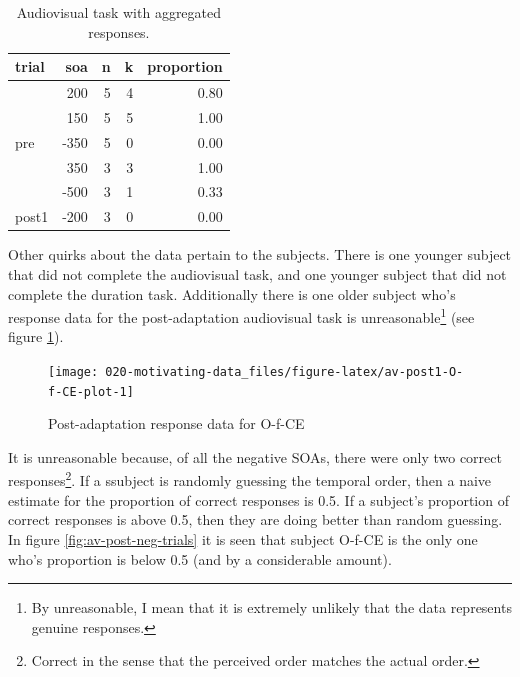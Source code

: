 \documentclass[11pt, oneside]{book}
\begin{document}
\begin{table}[!h]

\caption{\label{tab:av-bin-sample}Audiovisual task with aggregated responses.}
\centering
\begin{tabular}[t]{lrrrr}
\toprule
trial & soa & n & k & proportion\\
\midrule
 & 200 & 5 & 4 & 0.80\\
\cmidrule{2-5}
 & 150 & 5 & 5 & 1.00\\
\cmidrule{2-5}
\multirow[t]{-3}{*}{\raggedright\arraybackslash pre} & -350 & 5 & 0 & 0.00\\
\cmidrule{1-5}
 & 350 & 3 & 3 & 1.00\\
\cmidrule{2-5}
 & -500 & 3 & 1 & 0.33\\
\cmidrule{2-5}
\multirow[t]{-3}{*}{\raggedright\arraybackslash post1} & -200 & 3 & 0 & 0.00\\
\bottomrule
\end{tabular}
\end{table}

Other quirks about the data pertain to the subjects. There is one younger subject that did not complete the audiovisual task, and one younger subject that did not complete the duration task. Additionally there is one older subject who's response data for the post-adaptation audiovisual task is unreasonable\footnote{By unreasonable, I mean that it is extremely unlikely that the data represents genuine responses.} (see figure \ref{fig:av-post1-O-f-CE-plot}).

\begin{figure}

{\centering \texttt{[image: 020-motivating-data\_files/figure-latex/av-post1-O-f-CE-plot-1]} 

}

\caption{Post-adaptation response data for O-f-CE}\label{fig:av-post1-O-f-CE-plot}
\end{figure}

It is unreasonable because, of all the negative SOAs, there were only two correct responses\footnote{Correct in the sense that the perceived order matches the actual order.}. If a ssubject is randomly guessing the temporal order, then a naive estimate for the proportion of correct responses is 0.5. If a subject's proportion of correct responses is above 0.5, then they are doing better than random guessing. In figure \ref{fig:av-post-neg-trials} it is seen that subject O-f-CE is the only one who's proportion is below 0.5 (and by a considerable amount).
\end{document}
